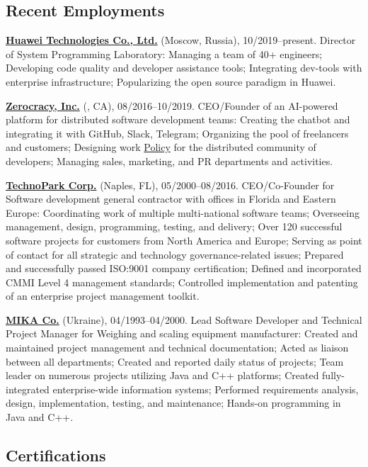\documentclass{yb}
\begin{document}
\subsection*{Recent Employments}

\textbf{\href{https://www.huawei.com}{Huawei Technologies Co., Ltd.}} (Moscow, Russia), 10/2019--present.
Director of System Programming Laboratory:
Managing a team of 40+ engineers;
Developing code quality and developer assistance tools;
Integrating dev-tools with enterprise infrastructure;
Popularizing the open source paradigm in Huawei.

\textbf{\href{https://www.zerocracy.com}{Zerocracy, Inc.}} (, CA), 08/2016--10/2019.
CEO/Founder of an AI-powered platform for distributed software development teams:
Creating the chatbot and integrating it with GitHub, Slack, Telegram;
Organizing the pool of freelancers and customers;
Designing work \href{https://www.zerocracy.com/policy.html}{Policy} for the distributed community of developers;
Managing sales, marketing, and PR departments and activities.

\textbf{\href{https://www.technoparkcorp.com}{TechnoPark Corp.}} (Naples, FL), 05/2000--08/2016.
CEO/Co-Founder for Software development general contractor with offices in Florida and Eastern Europe:
Coordinating work of multiple multi-national software teams;
Overseeing management, design, programming, testing, and delivery;
Over 120 successful software projects for customers from North America and Europe;
Serving as point of contact for all strategic and technology governance-related issues;
Prepared and successfully passed ISO:9001 company certification;
Defined and incorporated CMMI Level 4 management standards;
Controlled implementation and patenting of an enterprise project management toolkit.

\textbf{\href{http://www.mika.ua}{MIKA Co.}} (Ukraine), 04/1993--04/2000.
Lead Software Developer and Technical Project Manager for Weighing and scaling equipment manufacturer:
Created and maintained project management and technical documentation;
Acted as liaison between all departments;
Created and reported daily status of projects;
Team leader on numerous projects utilizing Java and C++ platforms;
Created fully-integrated enterprise-wide information systems;
Performed requirements analysis, design, implementation, testing, and maintenance;
Hands-on programming in Java and C++.

\subsection*{Certifications}
\end{document}

